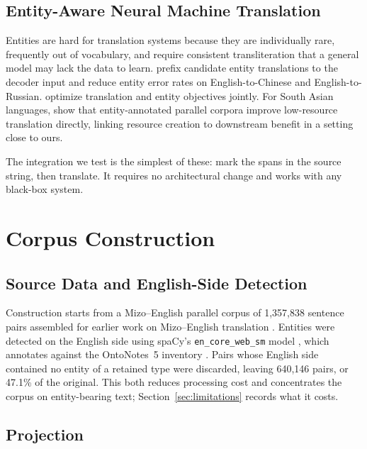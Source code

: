 \documentclass[acmsmall,screen,review]{acmart}
\begin{document}
\subsection{Entity-Aware Neural Machine Translation}
\label{sec:related:entitymt}

Entities are hard for translation systems because they are individually rare,
frequently out of vocabulary, and require consistent transliteration that a
general model may lack the data to learn. \citet{zeng2023extract} prefix
candidate entity translations to the decoder input and reduce entity error rates
on English-to-Chinese and English-to-Russian. \citet{nguyen2025multitask}
optimize translation and entity objectives jointly. For South Asian languages,
\citet{ranathunga2024parallel} show that entity-annotated parallel corpora
improve low-resource translation directly, linking resource creation to
downstream benefit in a setting close to ours.

The integration we test is the simplest of these: mark the spans in the source
string, then translate. It requires no architectural change and works with any
black-box system.

\section{Corpus Construction}
\label{sec:corpus}

\subsection{Source Data and English-Side Detection}
\label{sec:corpus:source}

Construction starts from a Mizo--English parallel corpus of 1,357,838 sentence
pairs assembled for earlier work on Mizo--English translation
\citep{dawngliani2023mizocorpus}. Entities were detected on the English side
using spaCy's \texttt{en\_core\_web\_sm} model \citep{honnibal2020spacy}, which
annotates against the OntoNotes~5 inventory \citep{weischedel2013ontonotes}.
Pairs whose English side contained no entity of a retained type were discarded,
leaving 640,146 pairs, or 47.1\% of the original. This both reduces processing
cost and concentrates the corpus on entity-bearing text;
Section~\ref{sec:limitations} records what it costs.

\subsection{Projection}
\label{sec:corpus:projection}
\end{document}
